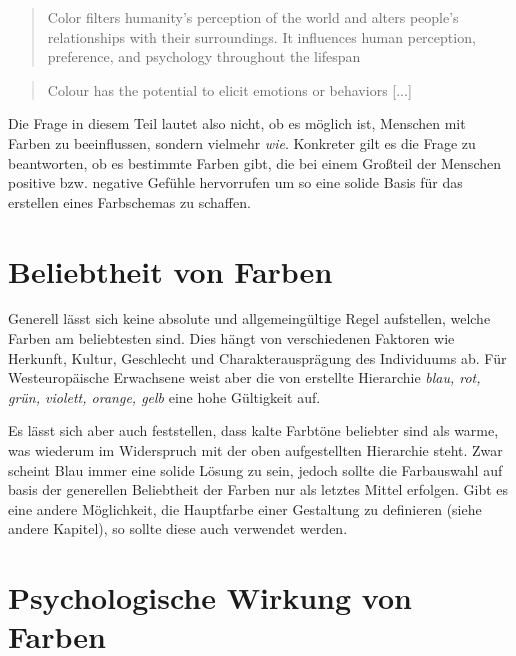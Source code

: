 \begin{quote}
Color filters humanity’s perception of the world and alters people’s relationships with their surroundings. It influences human perception, preference, and psychology throughout the lifespan \cite{cyr2010colour}
\end{quote}

\begin{quote}
Colour has the potential to elicit emotions or behaviors [...] \cite{rider2010color}
\end{quote}

Die Frage in diesem Teil lautet also nicht, ob es möglich ist, Menschen mit Farben zu beeinflussen, sondern vielmehr \textit{wie}. Konkreter gilt es die Frage zu beantworten, ob es bestimmte Farben gibt, die bei einem Großteil der Menschen positive bzw. negative Gefühle hervorrufen um so eine solide Basis für das erstellen eines Farbschemas zu schaffen.


\section{Beliebtheit von Farben}

Generell lässt sich keine absolute und allgemeingültige Regel aufstellen, welche Farben am beliebtesten sind. Dies hängt von verschiedenen Faktoren wie Herkunft, Kultur, Geschlecht und Charakterausprägung des Individuums ab. Für Westeuropäische Erwachsene weist aber die von \cite{eysenck1941critical} erstellte Hierarchie \textit{blau, rot, grün, violett, orange, gelb} eine hohe Gültigkeit auf.

Es lässt sich aber auch feststellen, dass kalte Farbtöne beliebter sind als warme, was wiederum im Widerspruch mit der oben aufgestellten Hierarchie steht. Zwar scheint Blau immer eine solide Lösung zu sein, jedoch sollte die Farbauswahl auf basis der generellen Beliebtheit der Farben nur als letztes Mittel erfolgen.
Gibt es eine andere Möglichkeit, die Hauptfarbe einer Gestaltung zu definieren (siehe andere Kapitel), so sollte diese auch verwendet werden.


\section{Psychologische Wirkung von Farben}


